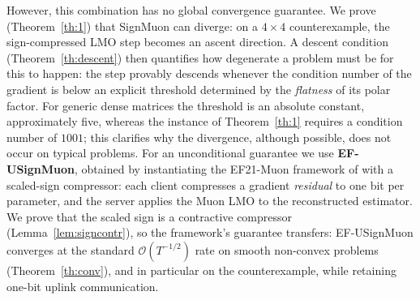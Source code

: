 \documentclass{article}
\begin{document}
However, this combination has no global convergence guarantee. We prove (Theorem~\ref{th:1}) that SignMuon can diverge: on a $4\times4$ counterexample, the sign-compressed LMO step becomes an ascent direction. A descent condition (Theorem~\ref{th:descent}) then quantifies how degenerate a problem must be for this to happen: the step provably descends whenever the condition number of the gradient is below an explicit threshold determined by the \emph{flatness} of its polar factor. For generic dense matrices the threshold is an absolute constant, approximately five, whereas the instance of Theorem~\ref{th:1} requires a condition number of $1001$; this clarifies why the divergence, although possible, does not occur on typical problems. For an unconditional guarantee we use \textbf{EF-USignMuon}, obtained by instantiating the EF21-Muon framework of \citet{gruntkowska2025error} with a scaled-sign compressor: each client compresses a gradient \emph{residual} to one bit per parameter, and the server applies the Muon LMO to the reconstructed estimator. We prove that the scaled sign is a contractive compressor (Lemma~\ref{lem:signcontr}), so the framework's guarantee transfers: EF-USignMuon converges at the standard $\mathcal{O}(T^{-1/2})$ rate on smooth non-convex problems (Theorem~\ref{th:conv}), and in particular on the counterexample, while retaining one-bit uplink communication.
\end{document}
